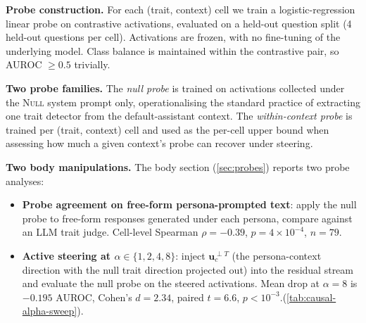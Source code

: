 \documentclass{article}
\theoremstyle{plain}
\theoremstyle{definition}
\theoremstyle{remark}
\begin{document}
\textbf{Probe construction.} For each (trait, context) cell we train a logistic-regression linear probe on contrastive activations, evaluated on a held-out question split (4 held-out questions per cell). Activations are frozen, with no fine-tuning of the underlying model. Class balance is maintained within the contrastive pair, so AUROC $\geq 0.5$ trivially.

\textbf{Two probe families.} The \emph{null probe} is trained on activations collected under the \textsc{Null} system prompt only, operationalising the standard practice of extracting one trait detector from the default-assistant context. The \emph{within-context probe} is trained per (trait, context) cell and used as the per-cell upper bound when assessing how much a given context's probe can recover under steering.

\textbf{Two body manipulations.} The body section (\cref{sec:probes}) reports two probe analyses:
\begin{itemize}
    \item \textbf{Probe agreement on free-form persona-prompted text}: apply the null probe to free-form responses generated under each persona, compare against an LLM trait judge. Cell-level Spearman $\rho = -0.39$, $p = 4 \times 10^{-4}$, $n = 79$.
    \item \textbf{Active steering at $\alpha \in \{1,2,4,8\}$}: inject $\mathbf{u}_c^{\perp T}$ (the persona-context direction with the null trait direction projected out) into the residual stream and evaluate the null probe on the steered activations. Mean drop at $\alpha = 8$ is $-0.195$ AUROC, Cohen's $d = 2.34$, paired $t = 6.6$, $p < 10^{-3}$.(\cref{tab:causal-alpha-sweep}).
\end{itemize}
\end{document}
